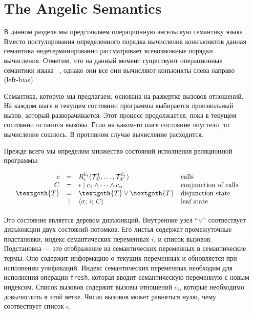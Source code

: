 \section{The Angelic Semantics}
\label{sec:angelic-semantics}

В данном разделе мы представляем операционную ангельскую семантику языка \mk. Вместо постулирования определенного порядка вычисления коннъюнктов данная семантика недетерминированно рассматривает всевозможные порядки вычисления. Отметим, что на данный момент существуют операционные семантики языка \mk~\cite{fair:conversion,fair:semantics}, однако они все они вычисляют конъюнкты слева направо (left-bias).

Семантика, которую мы предлагаем, основана на развертке вызовов отношений. На каждом шаге в текущем состоянии программы выбирается произвольный вызов, который разворачивается. Этот процесс продолжается, пока в текущем состоянии остаются вызовы. Если на каком-то шаге состояние опустело, то вычисление сошлось. В противном случае вычисление расходится.

Прежде всего мы определим множество состояний исполнения реляционной программы:

\[
\begin{array}{rcll}
  c & = & R_i^{k_i}(\mathcal{T}_\mathcal{X}^1, \ldots, \mathcal{T}_\mathcal{X}^{k_i}) & \mbox{calls} \\
  C & = & \epsilon \mid c_1 \land \dots \land c_n  & \mbox{conjunction of calls} \\
  \textgoth{T} & = & \textgoth{T} \lor \textgoth{T} & \mbox{disjunction state} \\
               & \mid & \inbr{\sigma;\, i;\, C} & \mbox{leaf state}\\[1mm]
\end{array}
\]


Это состояние является деревом дизъюнкций. Внутренние узел ``$\lor$'' соотвествует дизъюнкции двух состояний-потомков. Его листья содержат промежуточные подстановки, индекс семантических переменных $i$, и список вызовов. Подстановка --- это отображение из семантических переменных в семантические термы. Оно содержит информацию о текущих переменных и обновляется при исполнении унификаций. Индекс семантических переменных необходим для исполнения операции \lstinline|fresh|, которая вводит семантическую переменную с новым индексом. Список вызовов содержит вызовы отношений $c_i$, которые необходимо довычислить в этой ветке. Число вызовов может равняться нулю, чему соотвествует список $\epsilon$.

